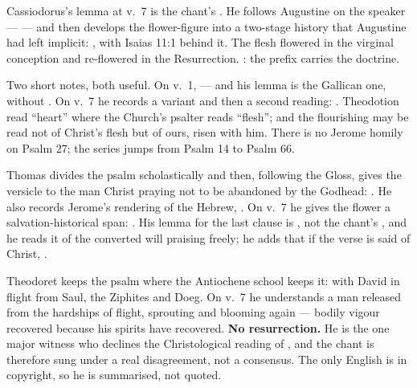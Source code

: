 \begin{witnessnote}
Cassiodorus's lemma at v.~7 is the chant's . He follows
Augustine on the speaker ---  --- and then develops the flower-figure into a two-stage history
that Augustine had left implicit: , with Isaias 11:1 behind it. The flesh flowered in the
virginal conception and re-flowered in the Resurrection. : the prefix carries the doctrine.
\end{witnessnote}

\begin{witnessnote}
Two short notes, both useful. On v.~1,  --- and
his lemma is the Gallican one, without . On v.~7 he records
a variant and then a second reading: . Theodotion read
``heart'' where the Church's psalter reads ``flesh''; and the flourishing may
be read not of Christ's flesh but of ours, risen with him. There is no Jerome
homily on Psalm 27; the  series jumps from
Psalm 14 to Psalm 66.
\end{witnessnote}

\begin{witnessnote}
Thomas divides the psalm scholastically and then, following the Gloss, gives
the versicle to the man Christ praying not to be abandoned by the Godhead:
. He also records Jerome's rendering of the
Hebrew, . On v.~7 he gives the flower a
salvation-historical span: . His lemma for the last clause is , not
the chant's , and he reads it of the converted will praising
freely; he adds that if the verse is said of Christ, .
\end{witnessnote}

\begin{witnessnote}
Theodoret keeps the psalm where the Antiochene school keeps it: with David in
flight from Saul, the Ziphites and Doeg. On v.~7 he understands a man released
from the hardships of flight, sprouting and blooming again --- bodily vigour
recovered because his spirits have recovered. \textbf{No resurrection.} He is
the one major witness who declines the Christological reading of
, and the chant is therefore sung under a real
disagreement, not a consensus. The only English is in copyright, so he is
summarised, not quoted.
\end{witnessnote}

